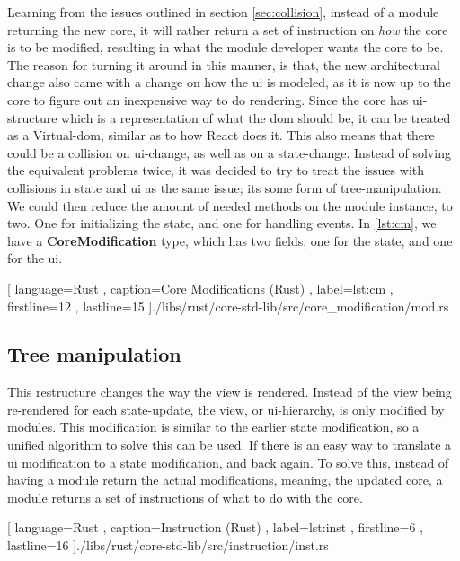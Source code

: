 Learning from the issues outlined in section \ref{sec:collision}, instead of a
module returning the new core, it will rather return a set of instruction on
\textit{how} the core is to be modified, resulting in what the module developer
wants the core to be. The reason for turning it around in this manner, is that,
the new architectural change also came with a change on how the \gls*{ui} is
modeled, as it is now up to the core to figure out an inexpensive way to do
rendering. Since the core has \gls*{ui}-structure which is a representation of
what the \gls*{dom} should be, it can be treated as a Virtual-\gls*{dom}, similar
as to how React does it. This also means that there could be a collision on
\gls*{ui}-change, as well as on a state-change. Instead of solving the equivalent
problems twice, it was decided to try to treat the issues with collisions in
state and \gls*{ui} as the same issue; its some form of tree-manipulation. We
could then reduce the amount of needed methods on the module instance, to two.
One for initializing the state, and one for handling events. In \ref{lst:cm},
we have a \textbf{CoreModification} type, which has two fields, one for the
state, and one for the \gls*{ui}.

\begin{center}
  
    [ language=Rust
    , caption={Core Modifications (Rust)}
    , label=lst:cm
    , firstline=12
    , lastline=15
    ]{./libs/rust/core-std-lib/src/core_modification/mod.rs}
\end{center}

\subsection{Tree manipulation}

This restructure changes the way the view is rendered. Instead of the view being
re-rendered for each state-update, the view, or \gls*{ui}-hierarchy, is only
modified by modules. This modification is similar to the earlier state
modification, so a unified algorithm to solve this can be used. If there is an
easy way to translate a \gls*{ui} modification to a state modification, and back
again. To solve this, instead of having a module return the actual
modifications, meaning, the updated core, a module returns a set of instructions
of what to do with the core.

\begin{code}[H]
  
   [ language=Rust
   , caption={Instruction (Rust)}
   , label=lst:inst
   , firstline=6
   , lastline=16
   ]{./libs/rust/core-std-lib/src/instruction/inst.rs}
\end{code}

